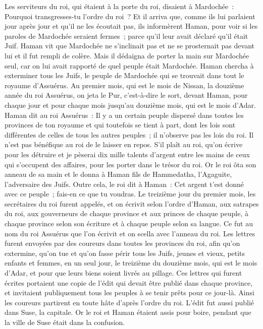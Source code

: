 \begin{multicols}{2}
Les serviteurs du roi, qui étaient à la porte du roi, disaient à Mardochée~: Pourquoi transgresses-tu l'ordre du roi~?
Et il arriva que, comme ils lui parlaient jour après jour et qu'il ne les écoutait pas, ils informèrent Haman, pour voir si les paroles de Mardochée seraient fermes~; parce qu'il leur avait déclaré qu'il était Juif.
Haman vit que Mardochée ne s'inclinait pas et ne se prosternait pas devant lui et il fut rempli de colère.
Mais il dédaigna de porter la main sur Mardochée seul, car on lui avait rapporté de quel peuple était Mardochée. Haman chercha à exterminer tous les Juifs, le peuple de Mardochée qui se trouvait dans tout le royaume d'Assuérus.
Au premier mois, qui est le mois de Nissan, la douzième année du roi Assuérus, on jeta le Pur, c'est-à-dire le sort, devant Haman, pour chaque jour et pour chaque mois jusqu'au douzième mois, qui est le mois d'Adar.
Haman dit au roi Assuérus~: Il y a un certain peuple dispersé dans toutes les provinces de ton royaume et qui toutefois se tient à part, dont les lois sont différentes de celles de tous les autres peuples~; il n'observe pas les lois du roi. Il n'est pas bénéfique au roi de le laisser en repos.
S'il plaît au roi, qu'on écrive pour les détruire et je pèserai dix mille talents d'argent entre les mains de ceux qui s'occupent des affaires, pour les porter dans le trésor du roi.
Or le roi ôta son anneau de sa main et le donna à Haman fils de Hammedatha, l'Agaguite, l'adversaire des Juifs.
Outre cela, le roi dit à Haman~: Cet argent t'est donné avec ce peuple~; fais-en ce que tu voudras.
Le treizième jour du premier mois, les secrétaires du roi furent appelés, et on écrivit selon l'ordre d'Haman, aux satrapes du roi, aux gouverneurs de chaque province et aux princes de chaque peuple, à chaque province selon son écriture et à chaque peuple selon sa langue. Ce fut au nom du roi Assuérus que l'on écrivit et on scella avec l'anneau du roi.
Les lettres furent envoyées par des coureurs dans toutes les provinces du roi, afin qu'on extermine, qu'on tue et qu'on fasse périr tous les Juifs, jeunes et vieux, petits enfants et femmes, en un seul jour, le treizième du douzième mois, qui est le mois d'Adar, et pour que leurs biens soient livrés au pillage.
Ces lettres qui furent écrites portaient une copie de l'édit qui devait être publié dans chaque province, et invitaient publiquement tous les peuples à se tenir prêts pour ce jour-là.
Ainsi les coureurs partirent en toute hâte d'après l'ordre du roi. L'édit fut aussi publié dans Suse, la capitale. Or le roi et Haman étaient assis pour boire, pendant que la ville de Suse était dans la confusion.

\end{multicols}
